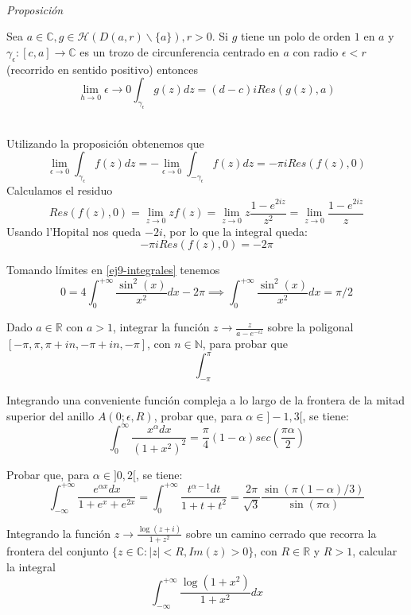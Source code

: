 \begin{sol}
	\
	
	
	\textit{Proposición}
	
	Sea $a\in\mathbb{C}, g\in\mathcal{H}(D(a,r)\backslash\{a\}), r>0$. Si $g$ tiene un polo de orden $1$ en $a$ y $\gamma_{\epsilon} : [c,a] \rightarrow\mathbb{C}$ es un trozo de circunferencia centrado en $a$ con radio $\epsilon<r$ (recorrido en sentido positivo) entonces
	$$ \lim_{h\rightarrow 0}\epsilon\rightarrow 0 \int_{\gamma_{\epsilon}} g(z)dz = (d-c)iRes(g(z),a) $$
	\
	
	Utilizando la proposición obtenemos que
	$$ \lim_{\epsilon\rightarrow 0} \int_{\gamma_{\epsilon}} f(z)dz = -\lim_{\epsilon\rightarrow 0} \int_{-\gamma_{\epsilon}} f(z)dz = -\pi iRes(f(z),0) $$
	Calculamos el residuo
	$$ Res(f(z),0) = \lim_{z\rightarrow 0} zf(z) = \lim_{z\rightarrow 0} z \frac{1-e^{2iz}}{z^2} =  \lim_{z\rightarrow 0} \frac{1-e^{2iz}}{z} $$
	Usando l'Hopital nos queda $-2i$, por lo que la integral queda:
	$$ -\pi iRes(f(z),0) = -2\pi $$
	
	Tomando límites en \ref{ej9-integrales} tenemos
	$$ 0=4\int_{0}^{+\infty} \frac{\sin^2(x)}{x^2} dx -2\pi  \implies  \int_{0}^{+\infty} \frac{\sin^2(x)}{x^2}dx = \pi/2 $$
\end{sol}


\begin{ejer}
	Dado $a\in\mathbb{R}$ con $a>1$, integrar la función $z\rightarrow \frac{z}{a-e^{-iz}}$ sobre la poligonal $[-\pi,\pi,\pi+in,-\pi+in,-\pi]$, con $n\in\mathbb{N}$, para probar que
	$$ \int_{-\pi}^{\pi} $$
\end{ejer}


\begin{ejer}
	Integrando una conveniente función compleja a lo largo de la frontera de la mitad superior del anillo $A(0;\epsilon,R)$, probar que, para $\alpha\in]-1,3[$, se tiene:
	$$ \int_{0}^{\infty} \frac{x^{\alpha}dx}{(1+x^2)^2} = \frac{\pi}{4}(1-\alpha)sec(\frac{\pi\alpha}{2}) $$
\end{ejer}


\begin{ejer}
	Probar que, para $\alpha\in ]0,2[$, se tiene:
	$$ \int_{-\infty}^{+\infty} \frac{e^{\alpha x}dx}{1+e^x+e^{2x}} = \int_{0}^{+\infty} \frac{t^{\alpha-1} dt}{1+t+t^2} = \frac{2\pi}{\sqrt{3}}\frac{\sin(\pi(1-\alpha)/3)}{\sin(\pi\alpha)} $$
\end{ejer}


\begin{ejer}
	Integrando la función $z\rightarrow\frac{\log(z+i)}{1+z^2}$ sobre un camino cerrado que recorra la frontera del conjunto $\{ z\in\mathbb{C} : |z|<R, Im(z)>0 \}$, con $R\in\mathbb{R}$ y $R>1$, calcular la integral
	$$ \int_{-\infty}^{+\infty} \frac{\log(1+x^2)}{1+x^2}dx $$
\end{ejer}



